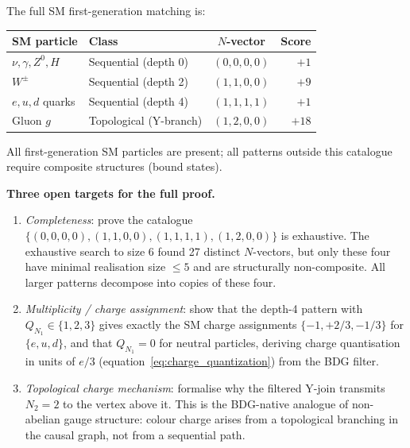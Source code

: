 \documentclass[11pt,a4paper]{article}
\begin{document}
The full SM first-generation matching is:
\begin{center}
\renewcommand{\arraystretch}{1.2}
\begin{tabular}{llcr}
\toprule
SM particle & Class & $N$-vector & Score \\
\midrule
$\nu, \gamma, Z^0, H$ & Sequential (depth 0) & $(0,0,0,0)$ & $+1$ \\
$W^\pm$ & Sequential (depth 2) & $(1,1,0,0)$ & $+9$ \\
$e, u, d$ quarks & Sequential (depth 4) & $(1,1,1,1)$ & $+1$ \\
Gluon $g$ & Topological (Y-branch) & $(1,2,0,0)$ & $+18$ \\
\bottomrule
\end{tabular}
\end{center}

All first-generation SM particles are present; all patterns outside this
catalogue require composite structures (bound states).

\textbf{Three open targets for the full proof.}
\begin{enumerate}[noitemsep]
\item \emph{Completeness}: prove the catalogue
  $\{(0,0,0,0),(1,1,0,0),(1,1,1,1),(1,2,0,0)\}$
  is exhaustive. The exhaustive search to size 6 found 27 distinct
  $N$-vectors, but only these four have minimal realisation size $\leq 5$
  and are structurally non-composite. All larger patterns decompose into
  copies of these four.
\item \emph{Multiplicity / charge assignment}: show that the depth-4
  pattern with $Q_{N_1} \in \{1,2,3\}$ gives exactly the SM charge
  assignments $\{-1, +2/3, -1/3\}$ for $\{e, u, d\}$, and that
  $Q_{N_1} = 0$ for neutral particles, deriving charge quantisation
  in units of $e/3$ (equation~\eqref{eq:charge_quantization}) from the BDG filter.
\item \emph{Topological charge mechanism}: formalise why the filtered
  Y-join transmits $N_2 = 2$ to the vertex above it. This is the
  BDG-native analogue of non-abelian gauge structure: colour charge
  arises from a topological branching in the causal graph, not from a
  sequential path.
\end{enumerate}
\end{document}
